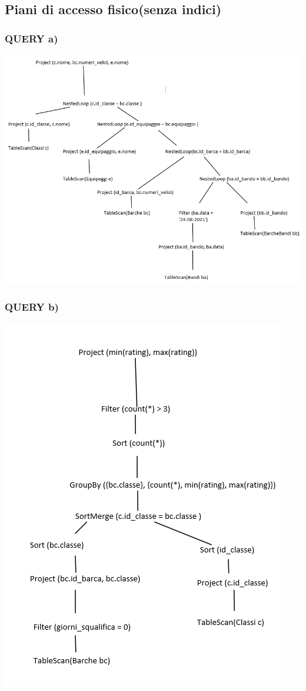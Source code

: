 \documentclass{article}
\begin{document}
\subsection{Piani di accesso fisico(senza indici)}

\subsubsection{QUERY a)}
\includegraphics[]{fisicoa.png}

\subsubsection{QUERY b)}
\includegraphics[]{fisicob.png}
\end{document}
